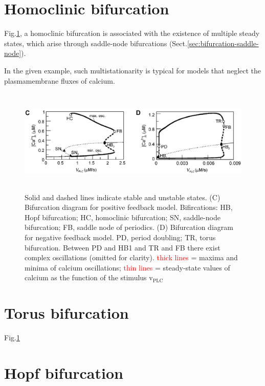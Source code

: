 \section{Homoclinic bifurcation}
\label{sec:bifurcation-homoclinic}

Fig.\ref{fig:bifurcations}, a homoclinic bifurcation is associated with the
existence of multiple steady states, which arise through saddle-node
bifurcations (Sect.\ref{sec:bifurcation-saddle-node}).

In the given example, such multistationarity is typical for models that neglect
the plasmamembrane fluxes of calcium.



\begin{figure}[hbt]
  \centerline{\includegraphics[height=5cm,
    angle=0]{./images/bifurcations.eps}}
\caption{Solid and dashed lines indicate stable and unstable states. (C)
Bifurcation diagram for positive feedback model. Bifircations: HB, Hopf bifurcation; HC, homoclinic bifurcation; SN,
saddle-node bifurcation; FB, saddle node of periodics. (D) Bifurcation diagram for negative
feedback model. PD, period doubling; TR, torus bifurcation. Between PD and HB1
and TR and FB there exist complex oscillations (omitted for clarity). 
\textcolor{red}{thick lines} = maxima and minima of calcium oscillations;
\textcolor{red}{thin lines} = steady-state values of calcium as the function of
the stimulus v$_\text{PLC}$ }
\label{fig:bifurcations}
\end{figure}

\section{Torus bifurcation}
\label{sec:bifurcation-torus}

Fig.\ref{fig:bifurcations}


\section{Hopf bifurcation}
\label{sec:hopf-bifurcation}
\label{sec:bifurcation-Hopf}


